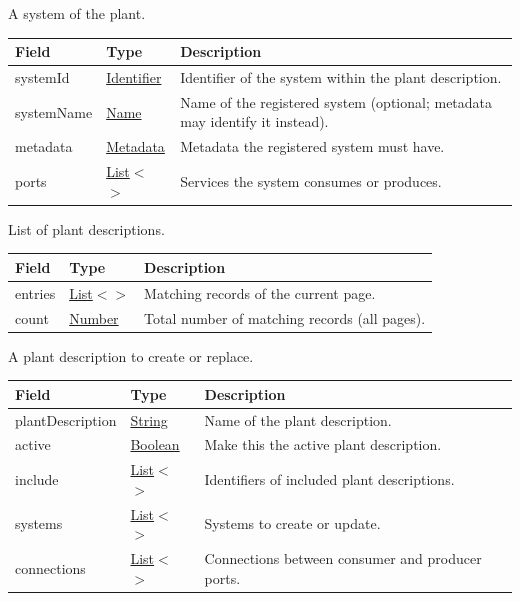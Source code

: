 \documentclass[a4paper]{arrowhead}
\newcommand{\mref}[2][]{{\textcolor{ArrowheadPurple}{\hyperref[sec:model:#2]{\ifstrempty{#1}{#2}{#1}}}}}
\newcommand{\pref}[1]{{\textcolor{ArrowheadGrey}{\hyperref[sec:model:primitives:#1]{#1}}}}
\begin{document}
A system of the plant.


\noindent\begin{tabularx}{\textwidth}{| >{\raggedright\arraybackslash}p{3.9cm} | >{\raggedright\arraybackslash\small}p{5.3cm} | X |} \hline
\rowcolor{gray!33} Field & Type & Description \\ \hline
system\allowbreak{}Id & \pref{Identifier} & Identifier of the system within the plant description. \\ \hline
system\allowbreak{}Name & \pref{Name} & Name of the registered system (optional; metadata may identify it instead). \\ \hline
metadata & \pref{Metadata} & Metadata the registered system must have. \\ \hline
ports & \pref{List}$<$\allowbreak{}\mref{Port}$>$ & Services the system consumes or produces. \\ \hline
\end{tabularx}




List of plant descriptions.


\noindent\begin{tabularx}{\textwidth}{| >{\raggedright\arraybackslash}p{3.9cm} | >{\raggedright\arraybackslash\small}p{5.3cm} | X |} \hline
\rowcolor{gray!33} Field & Type & Description \\ \hline
entries & \pref{List}$<$\allowbreak{}\mref{PlantDescriptionResponse}$>$ & Matching records of the current page. \\ \hline
count & \pref{Number} & Total number of matching records (all pages). \\ \hline
\end{tabularx}




A plant description to create or replace.


\noindent\begin{tabularx}{\textwidth}{| >{\raggedright\arraybackslash}p{3.9cm} | >{\raggedright\arraybackslash\small}p{5.3cm} | X |} \hline
\rowcolor{gray!33} Field & Type & Description \\ \hline
plant\allowbreak{}Description & \pref{String} & Name of the plant description. \\ \hline
active & \pref{Boolean} & Make this the active plant description. \\ \hline
include & \pref{List}$<$\allowbreak{}\pref{Number}$>$ & Identifiers of included plant descriptions. \\ \hline
systems & \pref{List}$<$\allowbreak{}\mref{PdeSystem}$>$ & Systems to create or update. \\ \hline
connections & \pref{List}$<$\allowbreak{}\mref{Connection}$>$ & Connections between consumer and producer ports. \\ \hline
\end{tabularx}
\end{document}
